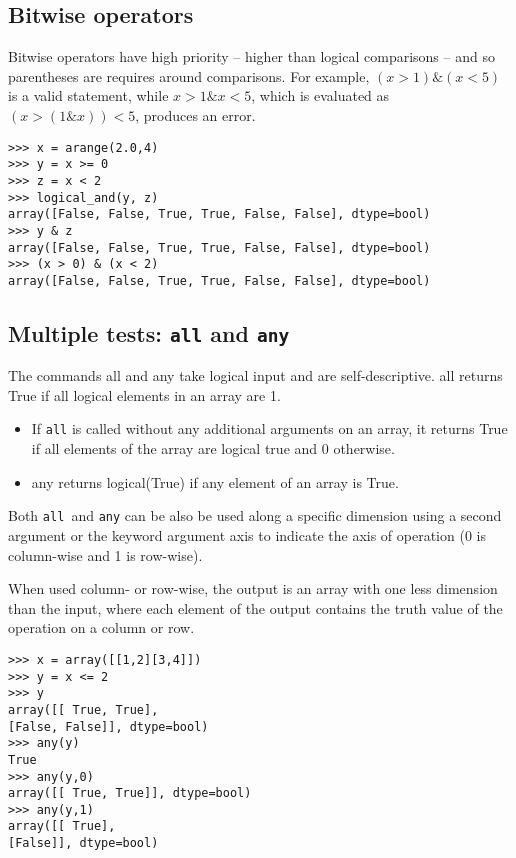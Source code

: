 \documentclass[KSmain.tex]{subfiles}
\begin{document}
 \subsection{Bitwise operators}
Bitwise operators have high priority – higher than logical comparisons – and so parentheses are requires around
comparisons. 
For example, $(x>1) \& (x<5)$ is a valid statement, while $x>1 \& x<5$, which is evaluated as
$(x>(1 \& x))<5$, produces an error.
\begin{framed}
\begin{verbatim}
>>> x = arange(2.0,4)
>>> y = x >= 0
>>> z = x < 2
>>> logical_and(y, z)
array([False, False, True, True, False, False], dtype=bool)
>>> y & z
array([False, False, True, True, False, False], dtype=bool)
>>> (x > 0) & (x < 2)
array([False, False, True, True, False, False], dtype=bool)
\end{verbatim}
\end{framed}
\newpage
\subsection{Multiple tests: \texttt{all} and \texttt{any}}
The commands all and any take logical input and are self-descriptive. all returns True if all logical elements
in an array are 1.
\begin{itemize}
\item  If \texttt{all} is called without any additional arguments on an array, it returns True if all
elements of the array are logical true and 0 otherwise. 
\item 
any returns logical(True) if any element of an array is True.
\end{itemize}
Both \texttt{all }and \texttt{any} can be also be used along a specific dimension using a second argument or the
keyword argument axis to indicate the axis of operation (0 is column-wise and 1 is row-wise). 

When used column- or row-wise, the output is an array with one less dimension than the input, where each element
of the output contains the truth value of the operation on a column or row.
\begin{framed}
\begin{verbatim}
>>> x = array([[1,2][3,4]])
>>> y = x <= 2
>>> y
array([[ True, True],
[False, False]], dtype=bool)
>>> any(y)
True
>>> any(y,0)
array([[ True, True]], dtype=bool)
>>> any(y,1)
array([[ True],
[False]], dtype=bool)
\end{verbatim}
\end{framed}
\end{document}
